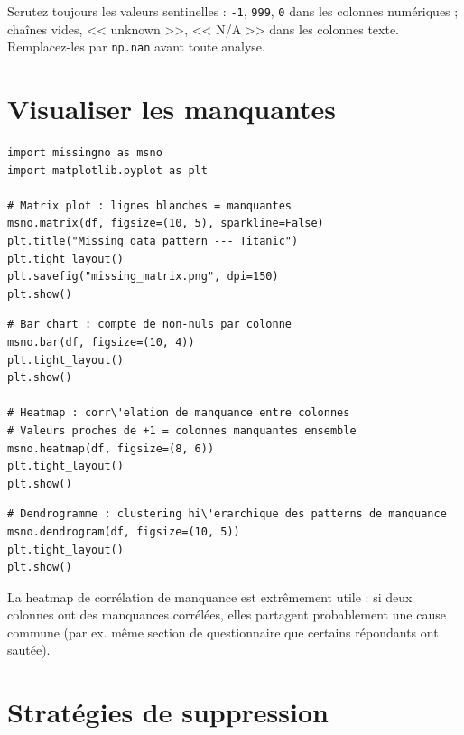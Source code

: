 \begin{datatip}
Scrutez toujours les valeurs sentinelles : \texttt{-1}, \texttt{999}, \texttt{0} dans les colonnes num\'eriques ; cha\^ines vides, << unknown >>, << N/A >> dans les colonnes texte. Remplacez-les par \texttt{np.nan} avant toute analyse.
\end{datatip}

\section{Visualiser les manquantes}

\begin{verbatim}
import missingno as msno
import matplotlib.pyplot as plt

# Matrix plot : lignes blanches = manquantes
msno.matrix(df, figsize=(10, 5), sparkline=False)
plt.title("Missing data pattern --- Titanic")
plt.tight_layout()
plt.savefig("missing_matrix.png", dpi=150)
plt.show()
\end{verbatim}

\begin{verbatim}
# Bar chart : compte de non-nuls par colonne
msno.bar(df, figsize=(10, 4))
plt.tight_layout()
plt.show()

# Heatmap : corr\'elation de manquance entre colonnes
# Valeurs proches de +1 = colonnes manquantes ensemble
msno.heatmap(df, figsize=(8, 6))
plt.tight_layout()
plt.show()
\end{verbatim}

\begin{verbatim}
# Dendrogramme : clustering hi\'erarchique des patterns de manquance
msno.dendrogram(df, figsize=(10, 5))
plt.tight_layout()
plt.show()
\end{verbatim}

\begin{preprocesstip}
La heatmap de corr\'elation de manquance est extr\^emement utile : si deux colonnes ont des manquances corr\'el\'ees, elles partagent probablement une cause commune (par ex. m\^eme section de questionnaire que certains r\'epondants ont saut\'ee).
\end{preprocesstip}

\section{Strat\'egies de suppression}

